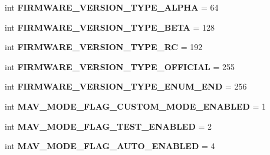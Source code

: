 \begin{DoxyCompactItemize}
int {\bfseries F\+I\+R\+M\+W\+A\+R\+E\+\_\+\+V\+E\+R\+S\+I\+O\+N\+\_\+\+T\+Y\+P\+E\+\_\+\+A\+L\+P\+HA} = 64
\item 
\mbox{\label{namespacepymavlink_1_1dialects_1_1v10_affa8e688dee843cb39848b123141fb7f}} 
int {\bfseries F\+I\+R\+M\+W\+A\+R\+E\+\_\+\+V\+E\+R\+S\+I\+O\+N\+\_\+\+T\+Y\+P\+E\+\_\+\+B\+E\+TA} = 128
\item 
\mbox{\label{namespacepymavlink_1_1dialects_1_1v10_ab668bdb29289aa917d39718489b098eb}} 
int {\bfseries F\+I\+R\+M\+W\+A\+R\+E\+\_\+\+V\+E\+R\+S\+I\+O\+N\+\_\+\+T\+Y\+P\+E\+\_\+\+RC} = 192
\item 
\mbox{\label{namespacepymavlink_1_1dialects_1_1v10_a2fcdab05981ec3a486b3bbf3da055edd}} 
int {\bfseries F\+I\+R\+M\+W\+A\+R\+E\+\_\+\+V\+E\+R\+S\+I\+O\+N\+\_\+\+T\+Y\+P\+E\+\_\+\+O\+F\+F\+I\+C\+I\+AL} = 255
\item 
\mbox{\label{namespacepymavlink_1_1dialects_1_1v10_a017a0b693da7df705e5752980c22c3f4}} 
int {\bfseries F\+I\+R\+M\+W\+A\+R\+E\+\_\+\+V\+E\+R\+S\+I\+O\+N\+\_\+\+T\+Y\+P\+E\+\_\+\+E\+N\+U\+M\+\_\+\+E\+ND} = 256
\item 
\mbox{\label{namespacepymavlink_1_1dialects_1_1v10_a34ce1b1745016752ca4a40e6d3d5b0d8}} 
int {\bfseries M\+A\+V\+\_\+\+M\+O\+D\+E\+\_\+\+F\+L\+A\+G\+\_\+\+C\+U\+S\+T\+O\+M\+\_\+\+M\+O\+D\+E\+\_\+\+E\+N\+A\+B\+L\+ED} = 1
\item 
\mbox{\label{namespacepymavlink_1_1dialects_1_1v10_a535601034c9dcc794a4a30bd7618d857}} 
int {\bfseries M\+A\+V\+\_\+\+M\+O\+D\+E\+\_\+\+F\+L\+A\+G\+\_\+\+T\+E\+S\+T\+\_\+\+E\+N\+A\+B\+L\+ED} = 2
\item 
\mbox{\label{namespacepymavlink_1_1dialects_1_1v10_a18f7b7ac888c7d7f005ff901868c21e5}} 
int {\bfseries M\+A\+V\+\_\+\+M\+O\+D\+E\+\_\+\+F\+L\+A\+G\+\_\+\+A\+U\+T\+O\+\_\+\+E\+N\+A\+B\+L\+ED} = 4
\item 
\mbox{\label{namespacepymavlink_1_1dialects_1_1v10_a365c92801d436e7506e6e65ba7fca934}} 

\end{DoxyCompactItemize}

